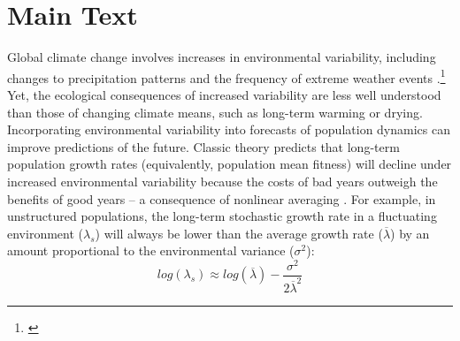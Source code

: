 \documentclass[12pt]{article}
\newcommand{\tom}[2]{{\color{red}{#1}}\footnote{\textit{\color{red}{#2}}}}
\begin{document}

\section*{Main Text}

Global climate change involves increases in environmental variability, including changes to precipitation patterns and the frequency of extreme weather events \cite{seneviratne2012changes,stocker2013technical, ipcc_2021}.\tom{}{The citation for reference 1 looks incomplete.}
Yet, the ecological consequences of increased variability are less well understood than those of changing climate means, such as long-term warming or drying. 
Incorporating environmental variability into forecasts of population dynamics can improve predictions of the future.
Classic theory predicts that long-term population growth rates (equivalently, population mean fitness) will decline under increased environmental variability because the costs of bad years outweigh the benefits of good years -- a consequence of nonlinear averaging \cite{lewontin_population_1969,tuljapurkar_population_1982}.
For example, in unstructured populations, the long-term stochastic growth rate in a fluctuating environment ($\lambda_s$) will always be lower than the average growth rate ($\overline{\lambda}$) by an amount proportional to the environmental variance ($\sigma^2$): 
\begin{equation}
	 log(\lambda_s)  \approx log(\overline{\lambda}) - \frac{\sigma^2}{2\overline{\lambda}^2}
\end{equation}
\end{document}
